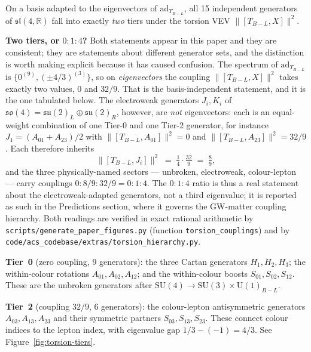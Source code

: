 \documentclass[11pt,a4paper]{article}
\theoremstyle{plain}
\theoremstyle{definition}
\theoremstyle{remark}
\begin{document}
On a basis adapted to the eigenvectors of $\mathrm{ad}_{T_{B{-}L}}$, all 15
independent generators of $\mathfrak{sl}(4,\mathbb{R})$ fall into exactly
\emph{two} tiers under the torsion VEV $\|[T_{B{-}L}, X]\|^2$.

\medskip
\noindent
\textbf{Two tiers, or $0{:}1{:}4$?}  Both statements appear in this paper and
they are consistent; they are statements about different generator sets, and
the distinction is worth making explicit because it has caused confusion.
The spectrum of $\mathrm{ad}_{T_{B{-}L}}$ is $\{0^{(9)}, (\pm 4/3)^{(3)}\}$, so
on \emph{eigenvectors} the coupling $\|[T_{B{-}L},X]\|^2$ takes exactly two
values, $0$ and $32/9$.  That is the basis-independent statement, and it is the
one tabulated below.  The electroweak generators $J_i, K_i$ of
$\mathfrak{so}(4) = \mathfrak{su}(2)_L \oplus \mathfrak{su}(2)_R$, however, are
\emph{not} eigenvectors: each is an equal-weight combination of one Tier-0 and
one Tier-2 generator, for instance $J_1 = (A_{01} + A_{23})/2$ with
$\|[T_{B{-}L},A_{01}]\|^2 = 0$ and $\|[T_{B{-}L},A_{23}]\|^2 = 32/9$.  Each
therefore inherits
\[
  \|[T_{B{-}L}, J_i]\|^2 \;=\; \tfrac14 \cdot \tfrac{32}{9} \;=\; \tfrac89 ,
\]
and the three physically-named sectors --- unbroken, electroweak, colour-lepton
--- carry couplings $0 : 8/9 : 32/9 = 0:1:4$.  The $0{:}1{:}4$ ratio is thus a
real statement about the electroweak-adapted generators, not a third eigenvalue;
it is reported as such in the Predictions section, where it governs the
GW-matter coupling hierarchy.  Both readings are verified in exact rational
arithmetic by \nolinkurl{scripts/generate_paper_figures.py} (function
\texttt{torsion\_couplings}) and by
\nolinkurl{code/acs_codebase/extras/torsion_hierarchy.py}.

\medskip
\noindent
\textbf{Tier~0} (zero coupling, 9 generators):
the three Cartan generators $H_1, H_2, H_3$;
the within-colour rotations $A_{01}, A_{02}, A_{12}$;
and the within-colour boosts $S_{01}, S_{02}, S_{12}$.
These are the unbroken generators after
$\mathrm{SU}(4) \to \mathrm{SU}(3) \times \mathrm{U}(1)_{B{-}L}$.

\medskip
\noindent
\textbf{Tier~2} (coupling $32/9$, 6 generators):
the colour-lepton antisymmetric generators $A_{03}, A_{13}, A_{23}$
and their symmetric partners $S_{03}, S_{13}, S_{23}$.
These connect colour indices to the lepton index, with eigenvalue
gap $1/3 - (-1) = 4/3$.
See Figure~\ref{fig:torsion-tiers}.
\end{document}
